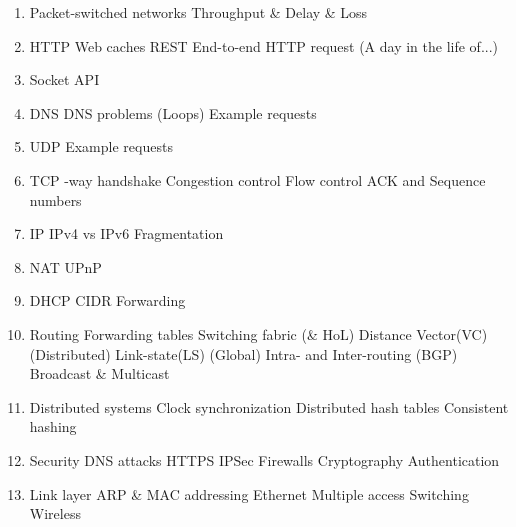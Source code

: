 \begin{enumerate}
    \item Packet-switched networks
        \subitem Throughput \& Delay \& Loss
    \item HTTP
        \subitem Web caches
        \subitem REST
        \subitem End-to-end HTTP request (A day in the life of...)
    \item Socket API
    \item DNS
        \subitem DNS problems (Loops)
        \subitem Example requests
    \item UDP
        \subitem Example requests
    \item TCP
        -way handshake
        \subitem Congestion control
        \subitem Flow control
        \subitem ACK and Sequence numbers
    \item IP
        \subitem IPv4 vs IPv6
        \subitem Fragmentation
    \item NAT
        \subitem UPnP
    \item DHCP
        \subitem CIDR
        \subitem Forwarding
    \item Routing
        \subitem Forwarding tables
        \subitem Switching fabric (\& HoL)
        \subitem Distance Vector(VC) (Distributed)
        \subitem Link-state(LS) (Global)
        \subitem Intra- and Inter-routing (BGP)
        \subitem Broadcast \& Multicast
    \item Distributed systems
        \subitem Clock synchronization
        \subitem Distributed hash tables
        \subitem Consistent hashing
    \item Security
        \subitem DNS attacks
        \subitem HTTPS
        \subitem IPSec
        \subitem Firewalls
        \subitem Cryptography
        \subitem Authentication
    \item Link layer
        \subitem ARP \& MAC addressing
        \subitem Ethernet
        \subitem Multiple access
        \subitem Switching
        \subitem Wireless
\end{enumerate}
